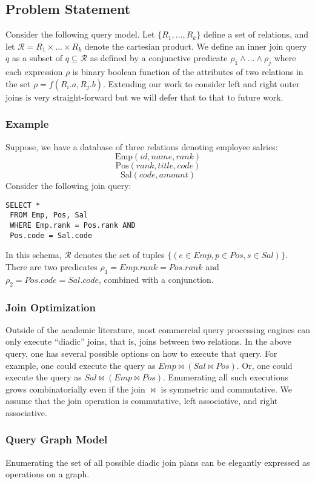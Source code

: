 \subsection*{Problem Statement}
Consider the following query model.
Let $\{R_1,...,R_k\}$ define a set of relations, and let $\mathcal{R} = R_1 \times ... \times R_k$ denote the cartesian product.
We define an inner join query $q$ as a subset of $q \subseteq \mathcal{R}$ as defined by a conjunctive predicate $\rho_1 \wedge ... \wedge \rho_j$ where each expression $\rho$ is binary boolean function of the attributes of two relations in the set $\rho = f(R_i.a, R_j.b)$.
Extending our work to consider left and right outer joins is very straight-forward but we will defer that to that to future work.

\subsubsection{Example}
Suppose, we have a database of three relations denoting employee salries:
\[
\text{Emp}(id, name, rank)
\]
\[
\text{Pos}(rank, title, code)
\]
\[
\text{Sal}(code, amount)
\]
Consider the following join query:
\begin{lstlisting}
SELECT *
 FROM Emp, Pos, Sal
 WHERE Emp.rank = Pos.rank AND
 Pos.code = Sal.code
\end{lstlisting}
In this schema, $\mathcal{R}$ denotes the set of tuples $\{(e \in Emp, p \in Pos, s \in Sal)\}$. There are two predicates $\rho_1 = Emp.rank = Pos.rank$ and $\rho_2 = Pos.code = Sal.code$, combined with a conjunction. 

\subsubsection{Join Optimization}
Outside of the academic literature, most commercial query processing engines can only execute ``diadic'' joins, that is, joins between two relations. In the above query, one has several possible options on how to execute that query. For example, one could execute the query as $Emp \bowtie (Sal \bowtie Pos)$. Or, one could execute the query as $Sal \bowtie (Emp \bowtie Pos)$. Enumerating all such executions grows combinatorially even if the join $\bowtie$ is symmetric and commutative.
We assume that the join operation is commutative, left associative, and right associative.

\subsubsection{Query Graph Model}
Enumerating the set of all possible diadic join plans can be elegantly expressed as operations on a graph.

